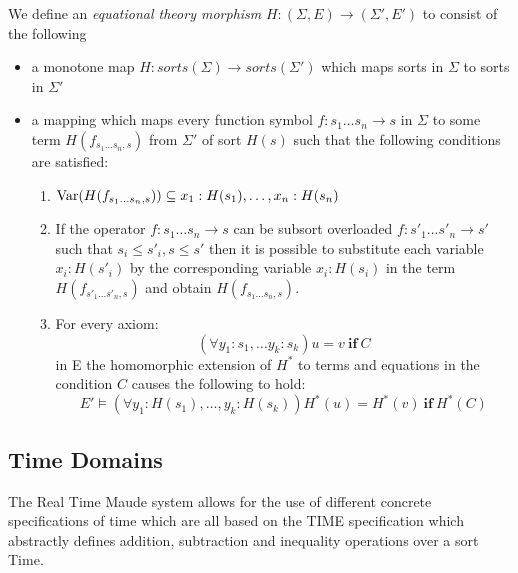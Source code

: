 \begin{mydef}
 We define an \emph{equational theory morphism} $H: (\Sigma,E) \to (\Sigma', E')$ to consist of the following
\begin{itemize}
\item a monotone map $H:sorts(\Sigma) \to sorts(\Sigma')$ which maps  sorts in $\Sigma$  to sorts in $\Sigma'$

\item a mapping which maps every function symbol $f : s_1 \ldots s_n \to s$ in $\Sigma$ to some term $H(f_{s_1 \ldots s_n, s})$ from $\Sigma'$ of sort $H(s)$ such that the following conditions are satisfied:
\begin{enumerate}

\item  $\mathrm{Var}(H(f_{s_1 \ldots s_n, s})) \subseteq {x_1:H(s_1), \ldots, x_n:H(s_n)}$

\item If the operator $f: s_1 \ldots s_n \to s$ can be subsort overloaded $f: s'_1 \ldots s'_n \to s'$ such that $s_i \leq s'_i, s\leq s'$ then it is possible to substitute each variable $x_i:H(s'_i)$ by the corresponding variable $x_i:H(s_i)$ in the term $H(f_{s'_1 \ldots s'_n, s})$ and obtain $H(f_{s_1 \ldots s_n, s})$.

\item For every axiom: $$(\forall y_1:s_1, \ldots y_k : s_k) u = v \ \textbf{if} \ C$$ in E the homomorphic extension of $H^*$ to terms and equations in the condition $C$ causes the following to hold:
   $$E' \models (\forall y_1 : H(s_1), \ldots, y_k : H(s_k)) H^*(u) = H^*(v) \ \textbf{if} \ H^*(C)$$
\end{enumerate}

\end{itemize}

\end{mydef}
\medskip

\subsection*{Time Domains}
The Real Time Maude system  allows for the use of different concrete specifications of time which are all based on the TIME specification \cite{PO02} which abstractly defines addition, subtraction and inequality operations over a sort Time. 

